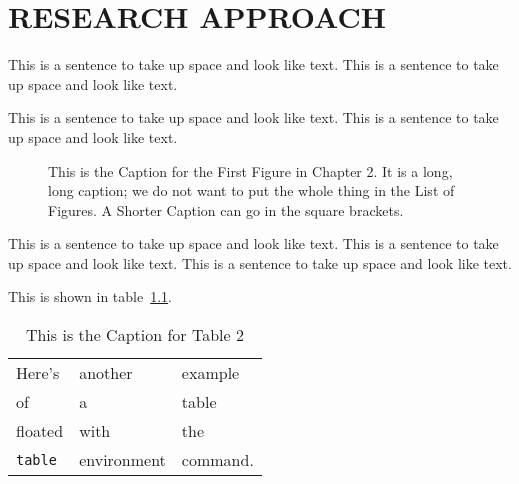  
\chapter{RESEARCH APPROACH}
This is a sentence to take up space and look like text.
This is a sentence to take up space and look like text.
 
This is a sentence to take up space and look like text.
This is a sentence to take up space and look like text.

\begin{figure}
\centering
\vspace{2.0in}
\caption[A Shorter Caption for the List of Figures]
   {This is the Caption for the First Figure in Chapter 2.  It is a
    long, long caption; we do not want to put the whole thing in the
    List of Figures. A Shorter Caption can go in the square brackets.}
\end{figure}
 
This is a sentence to take up space and look like text.
This is a sentence to take up space and look like text.
This is a sentence to take up space and look like text.

This is shown in table~\ref{mytable}.  %
 
\begin{table}
\caption{This is the Caption for Table 2}
\label{mytable}        %
\begin{center}
\begin{tabular}{lll}
Here's       & another     & example  \\
of           & a           & table    \\
floated      & with        & the      \\
\verb+table+ & environment & command.
\end{tabular}
\end{center}
\end{table}
 

